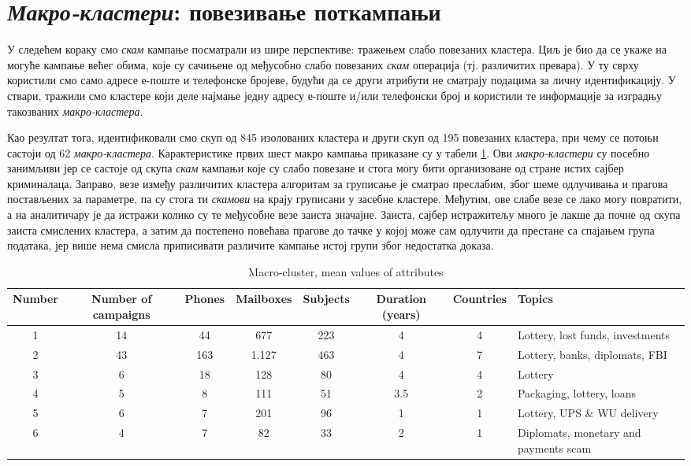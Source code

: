 \documentclass[a4paper]{article}
\begin{document}
\section{\emph{Макро-кластери}: повезивање поткампањи}
У следећем кораку смо \emph{скам} кампање посматрали из шире перспективе: тражењем слабо повезаних кластера. Циљ је био да се укаже на могуће кампање већег обима, које су сачињене од међусобно слабо повезаних \emph{скам} операција (тј. различитих превара). У ту сврху користили смо само адресе е-поште и телефонске бројеве, будући да се други атрибути не сматрају подацима за личну идентификацију. У ствари, тражили смо кластере који деле најмање једну адресу е-поште и/или телефонски број и користили те информације за изградњу такозваних \emph{макро-кластера}.

Као резултат тога, идентификовали смо скуп од 845 изолованих кластера и други скуп од 195 повезаних кластера, при чему се потоњи састоји од 62 \emph{макро-кластера}. Карактеристике првих шест макро кампања приказане су у табели \ref{tab:tabela6}. Ови \emph{макро-кластери} су посебно занимљиви јер се састоје од скупа \emph{скам} кампањи које су слабо повезане и стога могу бити организоване од стране истих сајбер криминалаца. Заправо, везе између различитих кластера алгоритам за груписање је сматрао преслабим, због шеме одлучивања и прагова постављених за параметре, па су стога ти \emph{скамови} на крају груписани у засебне кластере. Међутим, ове слабе везе се лако могу повратити, а на аналитичару је да истражи колико су те међусобне везе заиста значајне. Заиста, сајбер истражитељу много је лакше да почне од скупа заиста смислених кластера, а затим да постепено повећава прагове до тачке у којој може сам одлучити да престане са спајањем група података, јер више нема смисла приписивати различите кампање истој групи због недостатка доказа.

\begin{table}[h!]
\tiny
\begin{center}
\caption{Macro-cluster, mean values of attributes}
\hspace*{-6em}
\begin{tabular}{|c|c|c|c|c|c|c|l|} \hline
\textbf{Number} & \textbf{Number of campaigns} & \textbf{Phones} & \textbf{Mailboxes} & \textbf{Subjects} & \textbf{Duration (years)} & \textbf{Countries} & \textbf{Topics}\\ \hline
1 & 14 & 44 & 677 & 223 & 4 & 4 & Lottery, lost funds, investments\\ \hline
2 & 43 & 163 & 1.127 & 463 & 4 & 7 & Lottery, banks, diplomats, FBI\\ \hline
3 & 6 & 18 & 128 & 80 & 4 & 4 & Lottery\\ \hline
4 & 5 & 8 & 111 & 51 & 3.5 & 2 & Packaging, lottery, loans\\ \hline
5 & 6 & 7 & 201 & 96 & 1 & 1 & Lottery, UPS \& WU delivery\\ \hline
6 & 4 & 7 & 82 & 33 & 2 & 1 & Diplomats, monetary and payments scam\\ \hline
\end{tabular}
\label{tab:tabela6}
\end{center}
\end{table}
\end{document}
